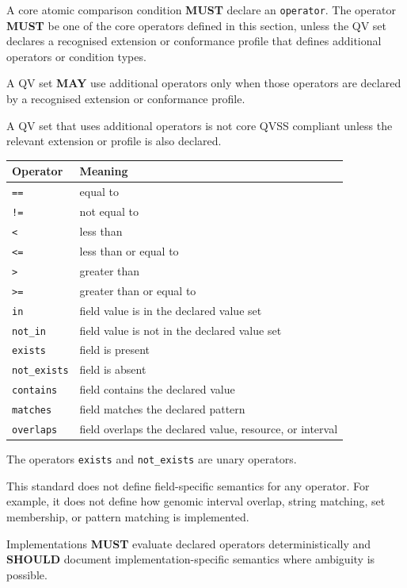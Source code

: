 \documentclass[11pt,a4paper]{article}
\begin{document}
A core atomic comparison condition \textbf{MUST} declare an \texttt{operator}. The operator \textbf{MUST} be one of the core operators defined in this section, unless the QV set declares a recognised extension or conformance profile that defines additional operators or condition types.

A QV set \textbf{MAY} use additional operators only when those operators are declared by a recognised extension or conformance profile.

A QV set that uses additional operators is not core QVSS compliant unless the relevant extension or profile is also declared.

\begin{center}
\begin{tabular}{ll}
\toprule
\textbf{Operator} & \textbf{Meaning} \\
\midrule
\texttt{==} & equal to \\
\texttt{!=} & not equal to \\
\texttt{<} & less than \\
\texttt{<=} & less than or equal to \\
\texttt{>} & greater than \\
\texttt{>=} & greater than or equal to \\
\texttt{in} & field value is in the declared value set \\
\texttt{not\_in} & field value is not in the declared value set \\
\texttt{exists} & field is present \\
\texttt{not\_exists} & field is absent \\
\texttt{contains} & field contains the declared value \\
\texttt{matches} & field matches the declared pattern \\
\texttt{overlaps} & field overlaps the declared value, resource, or interval \\
\bottomrule
\end{tabular}
\end{center}

The operators \texttt{exists} and \texttt{not\_exists} are unary operators.

This standard does not define field-specific semantics for any operator. For example, it does not define how genomic interval overlap, string matching, set membership, or pattern matching is implemented.

Implementations \textbf{MUST} evaluate declared operators deterministically and \textbf{SHOULD} document implementation-specific semantics where ambiguity is possible.
\end{document}
